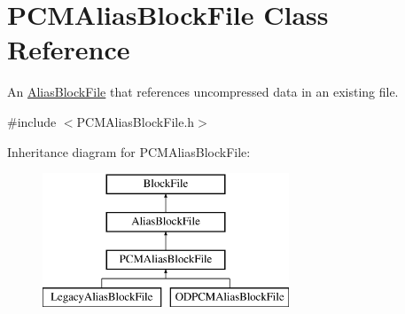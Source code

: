 \hypertarget{class_p_c_m_alias_block_file}{}\section{P\+C\+M\+Alias\+Block\+File Class Reference}
\label{class_p_c_m_alias_block_file}


An \hyperlink{class_alias_block_file}{Alias\+Block\+File} that references uncompressed data in an existing file.  




{\ttfamily \#include $<$P\+C\+M\+Alias\+Block\+File.\+h$>$}

Inheritance diagram for P\+C\+M\+Alias\+Block\+File\+:\begin{figure}[H]
\begin{center}
\leavevmode
\includegraphics[height=4.000000cm]{class_p_c_m_alias_block_file}
\end{center}
\end{figure}
